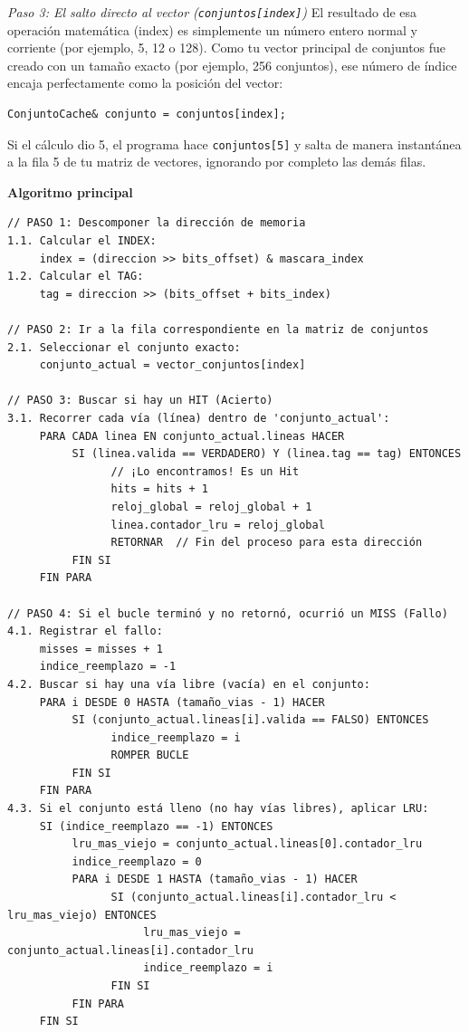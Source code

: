 \documentclass[12pt,a4paper]{article}
\begin{document}
\textit{Paso 3: El salto directo al vector (\texttt{conjuntos[index]})}
El resultado de esa operación matemática (index) es simplemente un número entero normal y corriente (por ejemplo, 5, 12 o 128). Como tu vector principal de conjuntos fue creado con un tamaño exacto (por ejemplo, 256 conjuntos), ese número de índice encaja perfectamente como la posición del vector:
\begin{verbatim}
ConjuntoCache& conjunto = conjuntos[index];
\end{verbatim}
Si el cálculo dio 5, el programa hace \texttt{conjuntos[5]} y salta de manera instantánea a la fila 5 de tu matriz de vectores, ignorando por completo las demás filas.

\textbf{Algoritmo principal}
\begin{verbatim}
// PASO 1: Descomponer la dirección de memoria
1.1. Calcular el INDEX:      
     index = (direccion >> bits_offset) & mascara_index
1.2. Calcular el TAG:      
     tag = direccion >> (bits_offset + bits_index)

// PASO 2: Ir a la fila correspondiente en la matriz de conjuntos
2.1. Seleccionar el conjunto exacto:      
     conjunto_actual = vector_conjuntos[index]

// PASO 3: Buscar si hay un HIT (Acierto)
3.1. Recorrer cada vía (línea) dentro de 'conjunto_actual':      
     PARA CADA linea EN conjunto_actual.lineas HACER           
          SI (linea.valida == VERDADERO) Y (linea.tag == tag) ENTONCES                
                // ¡Lo encontramos! Es un Hit                
                hits = hits + 1                
                reloj_global = reloj_global + 1                
                linea.contador_lru = reloj_global                
                RETORNAR  // Fin del proceso para esta dirección          
          FIN SI      
     FIN PARA

// PASO 4: Si el bucle terminó y no retornó, ocurrió un MISS (Fallo)
4.1. Registrar el fallo:      
     misses = misses + 1      
     indice_reemplazo = -1
4.2. Buscar si hay una vía libre (vacía) en el conjunto:      
     PARA i DESDE 0 HASTA (tamaño_vias - 1) HACER           
          SI (conjunto_actual.lineas[i].valida == FALSO) ENTONCES                
                indice_reemplazo = i                
                ROMPER BUCLE          
          FIN SI      
     FIN PARA
4.3. Si el conjunto está lleno (no hay vías libres), aplicar LRU:
     SI (indice_reemplazo == -1) ENTONCES          
          lru_mas_viejo = conjunto_actual.lineas[0].contador_lru          
          indice_reemplazo = 0                    
          PARA i DESDE 1 HASTA (tamaño_vias - 1) HACER                
                SI (conjunto_actual.lineas[i].contador_lru < lru_mas_viejo) ENTONCES                    
                     lru_mas_viejo = conjunto_actual.lineas[i].contador_lru                    
                     indice_reemplazo = i                
                FIN SI          
          FIN PARA      
     FIN SI


\end{verbatim}
\end{document}

